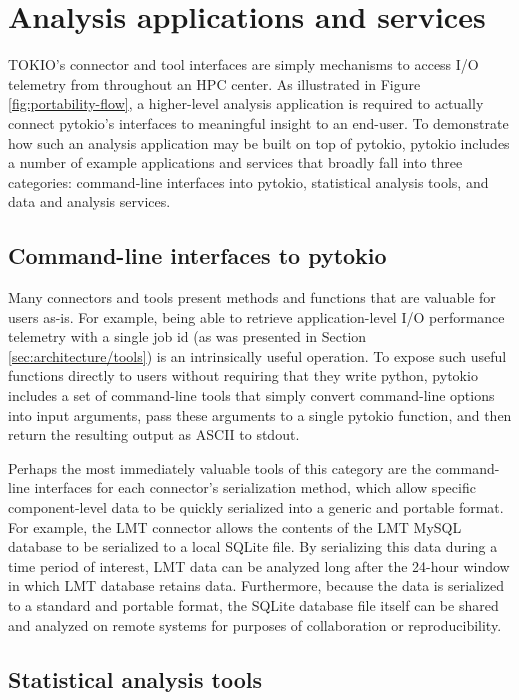 \section{Analysis applications and services} \label{sec:apps}

TOKIO's connector and tool interfaces are simply mechanisms to access I/O telemetry from throughout an HPC center.
As illustrated in Figure \ref{fig:portability-flow}, a higher-level analysis application is required to actually connect pytokio's interfaces to meaningful insight to an end-user.
To demonstrate how such an analysis application may be built on top of pytokio, pytokio includes a number of example applications and services that broadly fall into three categories: command-line interfaces into pytokio, statistical analysis tools, and data and analysis services.

\subsection{Command-line interfaces to pytokio} \label{sec:apps/cli}

Many connectors and tools present methods and functions that are valuable for users as-is.
For example, being able to retrieve application-level I/O performance telemetry with a single job id (as was presented in Section \ref{sec:architecture/tools}) is an intrinsically useful operation.
To expose such useful functions directly to users without requiring that they write python, pytokio includes a set of command-line tools that simply convert command-line options into input arguments, pass these arguments to a single pytokio function, and then return the resulting output as ASCII to stdout.

Perhaps the most immediately valuable tools of this category are the command-line interfaces for each connector's serialization method, which allow specific component-level data to be quickly serialized into a generic and portable format.
For example, the LMT connector allows the contents of the LMT MySQL database to be serialized to a local SQLite file.
By serializing this data during a time period of interest, LMT data can be analyzed long after the 24-hour window in which LMT database retains data.
Furthermore, because the data is serialized to a standard and portable format, the SQLite database file itself can be shared and analyzed on remote systems for purposes of collaboration or reproducibility.

\subsection{Statistical analysis tools} \label{sec:apps/analysis}

